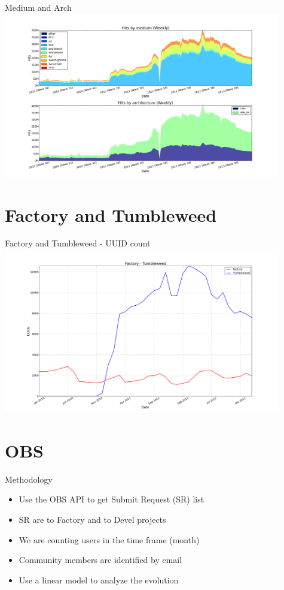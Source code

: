 \documentclass{beamer}
\begin{document}
\begin{frame}{Medium and Arch}
  \includegraphics[height=7.2cm]{medium_arch_week}
\end{frame}


\section{Factory and Tumbleweed}

\begin{frame}{Factory and Tumbleweed - UUID count}
  \includegraphics[height=7.2cm]{factory_tumbleweed}
\end{frame}


\section{OBS}

\begin{frame}{Methodology}
  \begin{itemize}
  \item Use the OBS API to get Submit Request (SR) list
  \item SR are to Factory and to Devel projects
  \item We are counting users in the time frame (month)
  \item Community members are identified by email
  \item Use a linear model to analyze the evolution
  \end{itemize}
\end{frame}
\end{document}
